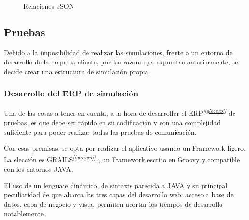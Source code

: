 \begin{figure}[H]
	\centering
		\caption{Relaciones JSON}
		\label{fig:and-Db}
	\end{figure}

\subsection{Pruebas}

Debido a la imposibilidad de realizar las simulaciones, frente a un entorno de desarrollo de la empresa cliente, por las razones ya expuestas anteriormente, se decide crear una estructura de simulación propia. 

\subsubsection{Desarrollo del ERP de simulación}

Una de las cosas a tener en cuenta, a la hora de desarrollar el ERP\textsuperscript{\textit{[\ref{glo:erp}]}} de pruebas, es que debe ser rápido en su codificación y con una complejidad suficiente para poder realizar todas las pruebas de comunicación.

Con esas premisas, se opta por realizar el aplicativo usando un Framework ligero. La elección es GRAILS\textsuperscript{\textit{[\ref{glo:gra}]}} , un Framework escrito en Groovy y compatible con los entornos JAVA.

El uso de un lenguaje dinámico, de sintaxis parecida a JAVA y su principal peculiaridad de que abarca las tres capas del desarrollo web: acceso a base de datos, capa de negocio y vista, permiten acortar los tiempos de desarrollo notablemente.

